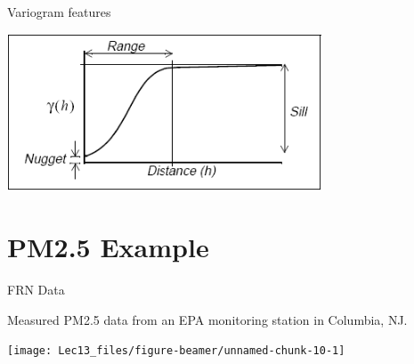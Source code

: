 \documentclass[11pt,ignorenonframetext,]{beamer}
\begin{document}
\begin{frame}{Variogram features}
\protect\hypertarget{variogram-features}{}

\begin{center}
\includegraphics[width=0.7\textwidth]{figs/variogram.png}
\end{center}

\end{frame}

\hypertarget{pm2.5-example}{%
\section{PM2.5 Example}\label{pm2.5-example}}

\begin{frame}{FRN Data}
\protect\hypertarget{frn-data}{}

Measured PM2.5 data from an EPA monitoring station in Columbia, NJ.

\begin{center}\texttt{[image: Lec13\_files/figure-beamer/unnamed-chunk-10-1]} \end{center}

\end{frame}
\end{document}
